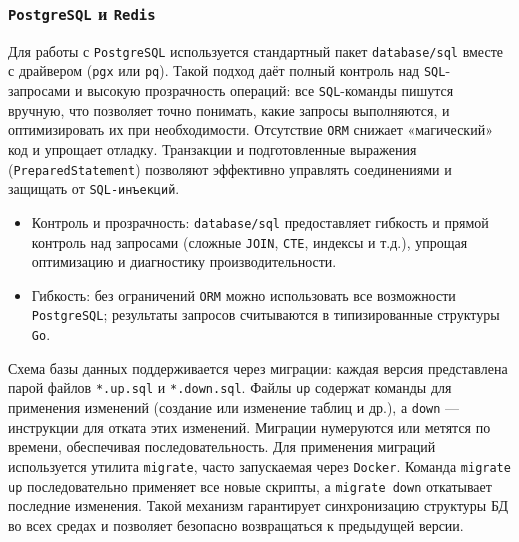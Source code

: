 \subsubsection*{\texttt{PostgreSQL} и \texttt{Redis}}
Для работы с \texttt{PostgreSQL} используется стандартный пакет \texttt{database/sql} вместе с драйвером (\texttt{pgx} или \texttt{pq}). Такой подход даёт полный контроль над \texttt{SQL}-запросами и высокую прозрачность операций: все \texttt{SQL}-команды пишутся вручную, что позволяет точно понимать, какие запросы выполняются, и оптимизировать их при необходимости. Отсутствие \texttt{ORM} снижает «магический» код и упрощает отладку. Транзакции и подготовленные выражения (\texttt{PreparedStatement}) позволяют эффективно управлять соединениями и защищать от \texttt{SQL-инъекций}.
\begin{itemize}
    \item Контроль и прозрачность: \texttt{database/sql} предоставляет гибкость и прямой контроль над запросами (сложные \texttt{JOIN}, \texttt{CTE}, индексы и т.д.), упрощая оптимизацию и диагностику производительности.
    \item Гибкость: без ограничений \texttt{ORM} можно использовать все возможности \texttt{PostgreSQL}; результаты запросов считываются в типизированные структуры \texttt{Go}.
\end{itemize}
\noindent Схема базы данных поддерживается через миграции: каждая версия представлена парой файлов \texttt{*.up.sql} и \texttt{*.down.sql}. Файлы \texttt{up} содержат команды для применения изменений (создание или изменение таблиц и др.), а \texttt{down} — инструкции для отката этих изменений. Миграции нумеруются или метятся по времени, обеспечивая последовательность. Для применения миграций используется утилита \texttt{migrate}, часто запускаемая через \texttt{Docker}. Команда \texttt{migrate up} последовательно применяет все новые скрипты, а \texttt{migrate down} откатывает последние изменения. Такой механизм гарантирует синхронизацию структуры БД во всех средах и позволяет безопасно возвращаться к предыдущей версии.

